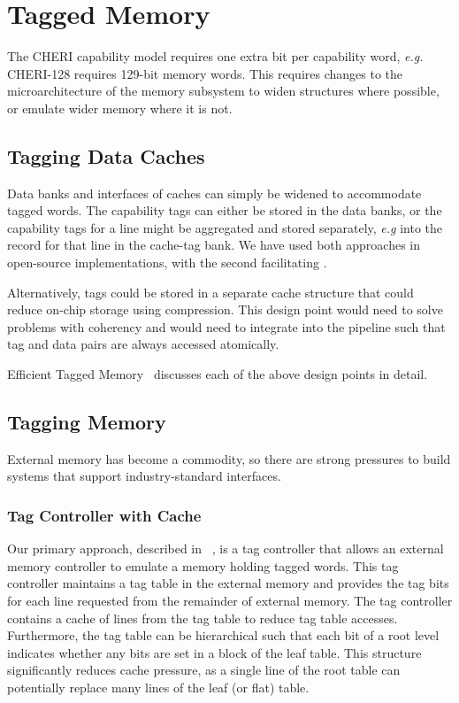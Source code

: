 \section{Tagged Memory}
The CHERI capability model requires one extra bit per capability word, \textit{e.g.} CHERI-128 requires 129-bit memory words.
This requires changes to the microarchitecture of the memory subsystem to widen structures where possible, or emulate wider memory where it is not.

\subsection{Tagging Data Caches}
Data banks and interfaces of caches can simply be widened to accommodate tagged words.
The capability tags can either be stored in the data banks, or the capability tags for a line might be aggregated and stored separately, \textit{e.g} into the record for that line in the cache-tag bank.
We have used both approaches in open-source implementations, with the second facilitating .

Alternatively, tags could be stored in a separate cache structure that could reduce on-chip storage using compression.
This design point would need to solve problems with coherency and would need to integrate into the pipeline such that tag and data pairs are always accessed atomically.

Efficient Tagged Memory~\cite{joannou2017:tagged-memory} discusses each of the above design points in detail.

\subsection{Tagging Memory}

External memory has become a commodity, so there are strong pressures to build systems that support industry-standard interfaces.

\subsubsection{Tag Controller with Cache}
Our primary approach, described in ~\cite{joannou2017:tagged-memory}, is a tag controller that allows an external memory controller to emulate a memory holding tagged words.
This tag controller maintains a tag table in the external memory and provides the tag bits for each line requested from the remainder of external memory.
The tag controller contains a cache of lines from the tag table to reduce tag table accesses.
Furthermore, the tag table can be hierarchical such that each bit of a root level indicates whether any bits are set in a block of the leaf table.
This structure significantly reduces cache pressure, as a single line of the root table can potentially replace many lines of the leaf (or flat) table.

